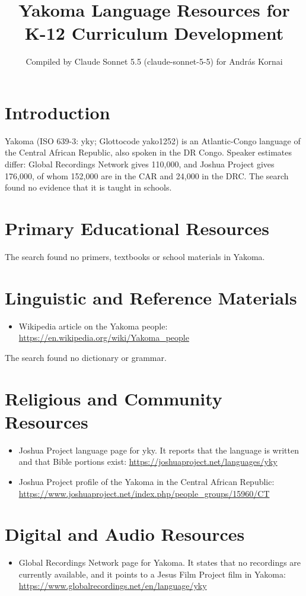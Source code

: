 \documentclass[12pt]{article}
\title{Yakoma Language Resources for K-12 Curriculum Development}
\author{Compiled by Claude Sonnet 5.5 (claude-sonnet-5-5) for Andr\'as Kornai}
\date{}
\begin{document}
\maketitle

\section{Introduction}
Yakoma (ISO 639-3: yky; Glottocode yako1252) is an Atlantic-Congo language of the Central African Republic, also spoken in the DR Congo. Speaker estimates differ: Global Recordings Network gives 110,000, and Joshua Project gives 176,000, of whom 152,000 are in the CAR and 24,000 in the DRC. The search found no evidence that it is taught in schools.

\section{Primary Educational Resources}
The search found no primers, textbooks or school materials in Yakoma.

\section{Linguistic and Reference Materials}
\begin{itemize}
\item Wikipedia article on the Yakoma people: \url{https://en.wikipedia.org/wiki/Yakoma_people}
\end{itemize}
The search found no dictionary or grammar.

\section{Religious and Community Resources}
\begin{itemize}
\item Joshua Project language page for yky. It reports that the language is written and that Bible portions exist: \url{https://joshuaproject.net/languages/yky}
\item Joshua Project profile of the Yakoma in the Central African Republic: \url{https://www.joshuaproject.net/index.php/people_groups/15960/CT}
\end{itemize}

\section{Digital and Audio Resources}
\begin{itemize}
\item Global Recordings Network page for Yakoma. It states that no recordings are currently available, and it points to a Jesus Film Project film in Yakoma: \url{https://www.globalrecordings.net/en/language/yky}
\end{itemize}
\end{document}
